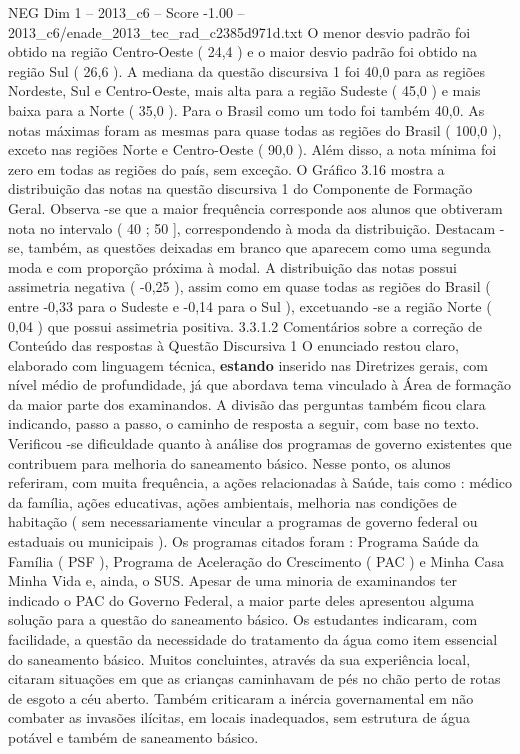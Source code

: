 \begin{textsample}{NEG Dim 1 – 2013\_c6 – Score -1.00 – 2013\_c6/enade\_2013\_tec\_rad\_c2385d971d.txt}
O menor desvio padrão foi obtido na região Centro-Oeste ( 24,4 ) e o maior desvio padrão foi obtido na região Sul ( 26,6 ).
A mediana da questão discursiva 1 foi 40,0 para as regiões Nordeste, Sul e Centro-Oeste, mais alta para a região Sudeste ( 45,0 ) e mais baixa para a Norte ( 35,0 ).
Para o Brasil como um todo foi também 40,0.
As notas máximas foram as mesmas para quase todas as regiões do Brasil ( 100,0 ), exceto nas regiões Norte e Centro-Oeste ( 90,0 ).
Além disso, a nota mínima foi zero em todas as regiões do país, sem exceção.
O Gráfico 3.16 mostra a distribuição das notas na questão discursiva 1 do Componente de Formação Geral.
Observa -se que a maior frequência corresponde aos alunos que obtiveram nota no intervalo ( 40 ; 50 ], correspondendo à moda da distribuição.
Destacam -se, também, as questões deixadas em branco que aparecem como uma segunda moda e com proporção próxima à modal.
A distribuição das notas possui assimetria negativa ( -0,25 ), assim como em quase todas as regiões do Brasil ( entre -0,33 para o Sudeste e -0,14 para o Sul ), excetuando -se a região Norte ( 0,04 ) que possui assimetria positiva. 3.3.1.2 Comentários sobre a correção de Conteúdo das respostas à Questão Discursiva 1 O enunciado restou claro, elaborado com linguagem técnica, \textbf{estando} inserido nas Diretrizes gerais, com nível médio de profundidade, já que abordava tema vinculado à Área de formação da maior parte dos examinandos.
A divisão das perguntas também ficou clara indicando, passo a passo, o caminho de resposta a seguir, com base no texto.
Verificou -se dificuldade quanto à análise dos programas de governo existentes que contribuem para melhoria do saneamento básico.
Nesse ponto, os alunos referiram, com muita frequência, a ações relacionadas à Saúde, tais como : médico da família, ações educativas, ações ambientais, melhoria nas condições de habitação ( sem necessariamente vincular a programas de governo federal ou estaduais ou municipais ).
Os programas citados foram : Programa Saúde da Família ( PSF ), Programa de Aceleração do Crescimento ( PAC ) e Minha Casa Minha Vida e, ainda, o SUS.
Apesar de uma minoria de examinandos ter indicado o PAC do Governo Federal, a maior parte deles apresentou alguma solução para a questão do saneamento básico.
Os estudantes indicaram, com facilidade, a questão da necessidade do tratamento da água como item essencial do saneamento básico.
Muitos concluintes, através da sua experiência local, citaram situações em que as crianças caminhavam de pés no chão perto de rotas de esgoto a céu aberto.
Também criticaram a inércia governamental em não combater as invasões ilícitas, em locais inadequados, sem estrutura de água potável e também de saneamento básico.

\end{textsample}

